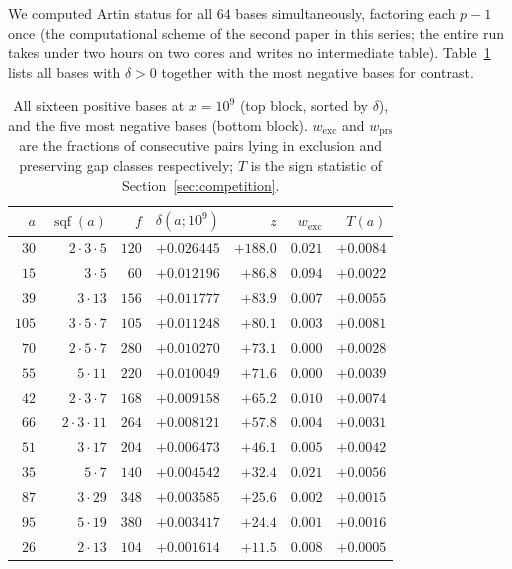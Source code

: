 \documentclass[11pt,reqno]{amsart}
\theoremstyle{plain}
\theoremstyle{definition}
\DeclareMathOperator{\sqf}{sqf}
\begin{document}
We computed Artin status for all $64$ bases simultaneously, factoring each
$p - 1$ once (the computational scheme of the second paper in this series;
the entire run takes under two hours on two cores and writes no intermediate
table). Table~\ref{tab:census} lists all bases with $\delta > 0$ together
with the most negative bases for contrast.

\begin{table}[t]
\centering
\caption{All sixteen positive bases at $x = 10^9$ (top block, sorted by
$\delta$), and the five most negative bases (bottom block). $w_{\mathrm{exc}}$
and $w_{\mathrm{prs}}$ are the fractions of consecutive pairs lying in
exclusion and preserving gap classes respectively; $T$ is the sign statistic
of Section~\ref{sec:competition}.}
\label{tab:census}
\begin{tabular}{rrrrrrr}
\toprule
$a$ & $\sqf(a)$ & $f$ & $\delta(a;10^9)$ & $z$ & $w_{\mathrm{exc}}$ & $T(a)$ \\
\midrule
$30$  & $2\cdot3\cdot5$   & $120$ & $+0.026445$ & $+188.0$ & $0.021$ & $+0.0084$ \\
$15$  & $3\cdot5$         & $60$  & $+0.012196$ & $+86.8$  & $0.094$ & $+0.0022$ \\
$39$  & $3\cdot13$        & $156$ & $+0.011777$ & $+83.9$  & $0.007$ & $+0.0055$ \\
$105$ & $3\cdot5\cdot7$   & $105$ & $+0.011248$ & $+80.1$  & $0.003$ & $+0.0081$ \\
$70$  & $2\cdot5\cdot7$   & $280$ & $+0.010270$ & $+73.1$  & $0.000$ & $+0.0028$ \\
$55$  & $5\cdot11$        & $220$ & $+0.010049$ & $+71.6$  & $0.000$ & $+0.0039$ \\
$42$  & $2\cdot3\cdot7$   & $168$ & $+0.009158$ & $+65.2$  & $0.010$ & $+0.0074$ \\
$66$  & $2\cdot3\cdot11$  & $264$ & $+0.008121$ & $+57.8$  & $0.004$ & $+0.0031$ \\
$51$  & $3\cdot17$        & $204$ & $+0.006473$ & $+46.1$  & $0.005$ & $+0.0042$ \\
$35$  & $5\cdot7$         & $140$ & $+0.004542$ & $+32.4$  & $0.021$ & $+0.0056$ \\
$87$  & $3\cdot29$        & $348$ & $+0.003585$ & $+25.6$  & $0.002$ & $+0.0015$ \\
$95$  & $5\cdot19$        & $380$ & $+0.003417$ & $+24.4$  & $0.001$ & $+0.0016$ \\
$26$  & $2\cdot13$        & $104$ & $+0.001614$ & $+11.5$  & $0.008$ & $+0.0005$ \\

\end{tabular}
\end{table}
\end{document}
